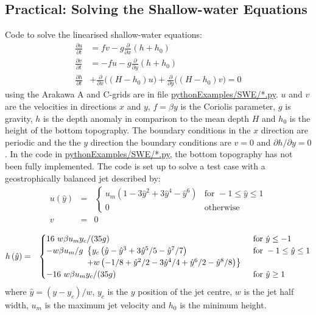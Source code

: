 \subsection{Practical: Solving the Shallow-water Equations}

Code to solve the linearised shallow-water equations:
\begin{align*}
\frac{\partial u}{\partial t} &= fv - g\frac{\partial}{\partial x}(h+h_0)\\
\frac{\partial v}{\partial t} &= -fu - g\frac{\partial}{\partial y}(h+h_0)\\
\frac{\partial h}{\partial t} & + 
\frac{\partial}{\partial x}\bigl((H-h_0)u\bigr) + \frac{\partial}{\partial y}\bigl((H-h_0)v\bigr)
 = 0
\end{align*}
using the Arakawa A and C-grids are in file \url{pythonExamples/SWE/*.py}. $u$ and $v$ are the velocities in directions $x$ and $y$, $f=\beta y$ is the Coriolis parameter, $g$ is gravity, $h$ is the depth anomaly in comparison to the mean depth $H$ and $h_0$ is the height of the bottom topography. The boundary conditions in the $x$ direction are periodic and the the $y$ direction the boundary conditions are $v=0$ and $\partial h/\partial y=0$. In the code in \url{pythonExamples/SWE/*.py}, the bottom topography has not been fully implemented. The code is set up to solve a test case with a geostrophically balanced jet described by:
\begin{eqnarray*}
u(\hat{y}) & = & \begin{cases}
u_m\left(1-3\hat{y}^{2}+3\hat{y}^{4}-\hat{y}^{6}\right) & \text{for }-1\le\hat{y}\le1\\
0 & \text{otherwise}
\end{cases}\\
v & = & 0\\
\end{eqnarray*}
\begin{eqnarray*}
h\left(\hat{y}\right) & = & \begin{cases}
16\ w\beta u_m y_{c}/(35g) & \textnormal{for }\hat{y}\le-1\\
-w\beta u_m/g\begin{array}[t]{l}
\bigl\{ y_{c}\left(\hat{y}-\hat{y}^{3}+3\hat{y}^{5}/5-\hat{y}^{7}/7\right)\\
+w\left(-1/8+\hat{y}^{2}/2-3\hat{y}^{4}/4+\hat{y}^{6}/2-\hat{y}^{8}/8\right)\bigr\}
\end{array} & \textnormal{for }-1\le\hat{y}\le1\\
-16\ w\beta u_m y_{c}/(35g) & \textnormal{for }\hat{y}\ge1
\end{cases}
\end{eqnarray*}
where $\hat{y}=(y-y_{c})/w$, $y_{c}$ is the $y$ position
of the jet centre, $w$ is the jet half width, $u_m$ is the maximum
jet velocity and $h_{0}$ is the minimum height.

